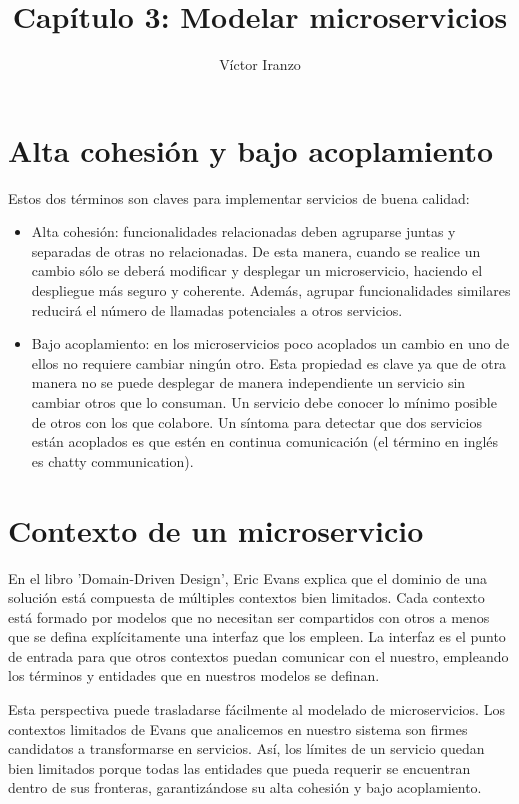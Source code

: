 \documentclass[11pt,a4paper]{article}
\author{Víctor Iranzo}
\title{Capítulo 3: Modelar microservicios}
\begin{document}
\maketitle

\section{Alta cohesión y bajo acoplamiento}

Estos dos términos son claves para implementar servicios de buena calidad:

\begin{itemize}

\item Alta cohesión: funcionalidades relacionadas deben agruparse juntas y separadas de otras no relacionadas. De esta manera, cuando se realice un cambio sólo se deberá modificar y desplegar un microservicio, haciendo el despliegue más seguro y coherente. Además, agrupar funcionalidades similares reducirá el número de llamadas potenciales a otros servicios.

\item Bajo acoplamiento: en los microservicios poco acoplados un cambio en uno de ellos no requiere cambiar ningún otro. Esta propiedad es clave ya que de otra manera no se puede desplegar de manera independiente un servicio sin cambiar otros que lo consuman. Un servicio debe conocer lo mínimo posible de otros con los que colabore. Un síntoma para detectar que dos servicios están acoplados es que estén en continua comunicación (el término en inglés es chatty communication).

\end{itemize}

\section{Contexto de un microservicio}

En el libro 'Domain-Driven Design', Eric Evans explica que el dominio de una solución está compuesta de múltiples contextos bien limitados. Cada contexto está formado por modelos que no necesitan ser compartidos con otros a menos que se defina explícitamente una interfaz que los empleen. La interfaz es el punto de entrada para que otros contextos puedan comunicar con el nuestro, empleando los términos y entidades que en nuestros modelos se definan.

Esta perspectiva puede trasladarse fácilmente al modelado de microservicios. Los contextos limitados de Evans que analicemos en nuestro sistema son firmes candidatos a transformarse en servicios. Así, los límites de un servicio quedan bien limitados porque  todas las entidades que pueda requerir se encuentran dentro de sus fronteras, garantizándose su alta cohesión y bajo acoplamiento.
\end{document}
